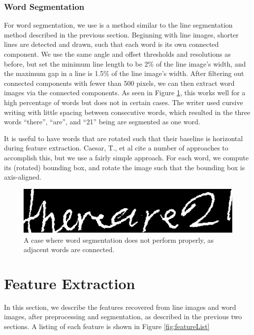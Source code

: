\documentclass[paper=a4, fontsize=11pt]{scrartcl} %
\numberwithin{equation}{section} %
\numberwithin{figure}{section} %
\numberwithin{table}{section} %
\begin{document}
\subsubsection{Word Segmentation}
For word segmentation, we use is a method similar to the line
segmentation method described in the previous section. Beginning with
line images, shorter lines are detected and drawn, such that each word
is its own connected component. We use the same angle and offset
thresholds and resolutions as before, but set the minimum line length
to be 2\% of the line image's width, and the maximum gap in a line is
1.5\% of the line image's width. After filtering out connected
components with fewer than 500 pixels, we can then extract word images
via the connected components. As seen in Figure \ref{fig:wordfail},
this works well for a high percentage of words but does not in certain
cases. The writer used cursive writing with little spacing between
consecutive words, which resulted in the three words ``there'',
``are'', and ``21'' being are segmented as one word.


It is useful to have words that are rotated such that their baseline
is horizontal during feature extraction. Caesar, T., et al
\cite{Preprocessing} cite a number of approaches to accomplish this,
but we use a fairly simple approach. For each word, we compute its
(rotated) bounding box, and rotate the image such that the bounding
box is axis-aligned.

\begin{figure}
  \centering \includegraphics{wordfail.png}
  \caption{A case where word segmentation does not perform properly,
    as adjacent words are connected.}
  \label{fig:wordfail}
\end{figure}


\section{Feature Extraction}
\label{sec:feature}
In this section, we describe the features recovered from line images
and word images, after preprocessing and segmentation, as described in
the previous two sections. A listing of each feature is shown in
Figure \ref{fig:featureList}
\end{document}
